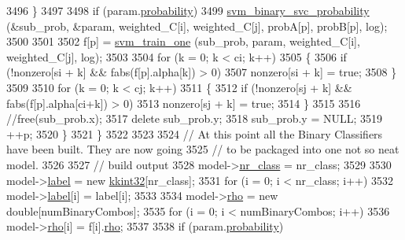 \begin{DoxyCode}
{3496         \}
3497 
3498         \textcolor{keywordflow}{if}  (param.\hyperlink{struct_s_v_m289___m_f_s_1_1svm__parameter_a34eba918ae65f56f3186bbdeae8ccd4b}{probability})
3499           \hyperlink{svm2_8cpp_a0c841901f7446261a95fc3b3ef8621e4}{svm\_binary\_svc\_probability} (&sub\_prob, &param, weighted\_C[i], 
      weighted\_C[j], probA[p], probB[p], log);
3500 
3501 
3502         f[p] = \hyperlink{namespace_s_v_m289___m_f_s_a6279cafea600d623c395f1a984639ec2}{svm\_train\_one} (sub\_prob, param, weighted\_C[i], weighted\_C[j], log);
3503 
3504         \textcolor{keywordflow}{for}  (k = 0;  k < ci;  k++)
3505         \{
3506           \textcolor{keywordflow}{if}  (!nonzero[si + k]  &&  fabs(f[p].alpha[k]) > 0)
3507             nonzero[si + k] = \textcolor{keyword}{true};
3508         \}
3509 
3510         \textcolor{keywordflow}{for}  (k = 0;  k < cj;  k++)
3511         \{
3512           \textcolor{keywordflow}{if}  (!nonzero[sj + k]  &&  fabs(f[p].alpha[ci+k]) > 0)
3513             nonzero[sj + k] = \textcolor{keyword}{true};
3514         \}
3515 
3516         \textcolor{comment}{//free(sub\_prob.x);}
3517         \textcolor{keyword}{delete}  sub\_prob.y;  
3518         sub\_prob.y = NULL;
3519         ++p;
3520       \}
3521     \}
3522 
3523 
3524     \textcolor{comment}{// At this point all the Binary Classifiers have been built.  They are now going }
3525     \textcolor{comment}{// to be packaged into one not so neat model.}
3526 
3527     \textcolor{comment}{// build output}
3528     model->\hyperlink{struct_s_v_m289___m_f_s_1_1_svm___model_a0cf11115996187369bc6152f30f6e64c}{nr\_class} = nr\_class;
3529     
3530     model->\hyperlink{struct_s_v_m289___m_f_s_1_1_svm___model_a2f46b2e4f808a25c5f4d15e65c988872}{label} = \textcolor{keyword}{new} \hyperlink{namespace_k_k_b_a8fa4952cc84fda1de4bec1fbdd8d5b1b}{kkint32}[nr\_class];
3531     \textcolor{keywordflow}{for}  (i = 0;  i < nr\_class;  i++)
3532       model->\hyperlink{struct_s_v_m289___m_f_s_1_1_svm___model_a2f46b2e4f808a25c5f4d15e65c988872}{label}[i] = label[i];
3533     
3534     model->\hyperlink{struct_s_v_m289___m_f_s_1_1_svm___model_ac6ee5562a25222e436bb29497cc98525}{rho} = \textcolor{keyword}{new} \textcolor{keywordtype}{double}[numBinaryCombos];
3535     for  (i = 0;  i < numBinaryCombos;  i++)
3536       model->\hyperlink{struct_s_v_m289___m_f_s_1_1_svm___model_ac6ee5562a25222e436bb29497cc98525}{rho}[i] = f[i].\hyperlink{struct_s_v_m289___m_f_s_1_1decision__function_a6d758b106c06798b94311f4a6c498519}{rho};
3537 
3538     if  (param.\hyperlink{struct_s_v_m289___m_f_s_1_1svm__parameter_a34eba918ae65f56f3186bbdeae8ccd4b}{probability})
}
\end{DoxyCode}
